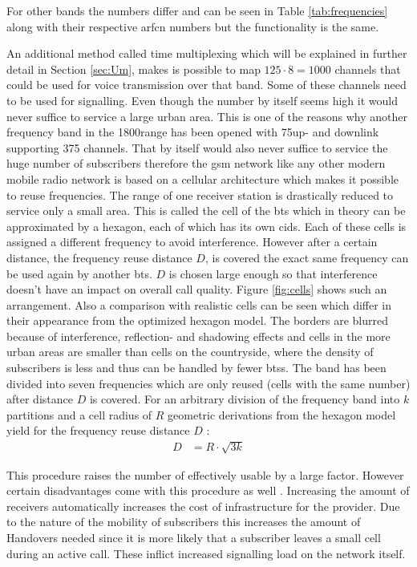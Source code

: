 For other bands the numbers differ and can be seen in Table \ref{tab:frequencies} along with their respective \gls{arfcn} numbers but the functionality is the same.

An additional method called time multiplexing which will be explained in further detail in Section \ref{sec:Um}, makes is possible to map $125 \cdot 8 = 1000$ channels that could be used for voice transmission over that band.
Some of these channels need to be used for signalling.
Even though the number by itself seems high it would never suffice to service a large urban area.
This is one of the reasons why another frequency band in the 1800\MHz range has been opened with 75\MHz up- and downlink supporting 375 channels.
That by itself would also never suffice to service the huge number of subscribers therefore the \gls{gsm} network like any other modern mobile radio network is based on a cellular architecture which makes it possible to reuse frequencies.
The range of one receiver station is drastically reduced to service only a small area.
This is called the cell of the \gls{bts} which in theory can be approximated by a hexagon, each of which has its own \glspl{cid}.
Each of these cells is assigned a different frequency to avoid interference.
However after a certain distance, the frequency reuse distance $D$, is covered the exact same frequency can be used again by another \gls{bts}.
$D$ is chosen large enough so that interference doesn't have an impact on overall call quality.
Figure \ref{fig:cells} shows such an arrangement.
Also a comparison with realistic cells can be seen which differ in their appearance from the optimized hexagon model.
The borders are blurred because of interference, reflection- and shadowing effects and cells in the more urban areas are smaller than cells on the countryside, where the density of subscribers is less and thus can be handled by fewer \glspl{bts}.
The band has been divided into seven frequencies which are only reused (cells with the same number) after distance $D$ is covered.
For an arbitrary division of the frequency band into $k$ partitions and a cell radius of $R$ geometric derivations from the hexagon model yield for the frequency reuse distance $D$ \cite{GSM2009}:
\begin{align}
D	&=R\cdot\sqrt{3k}
\end{align}

This procedure raises the number of effectively usable by a large factor.
However certain disadvantages come with this procedure as well \cite{protocols1999}.
Increasing the amount of receivers automatically increases the cost of infrastructure for the provider.
Due to the nature of the mobility of subscribers this increases the amount of Handovers needed since it is more likely that a subscriber leaves a small cell during an active call.
These inflict increased signalling load on the network itself.

